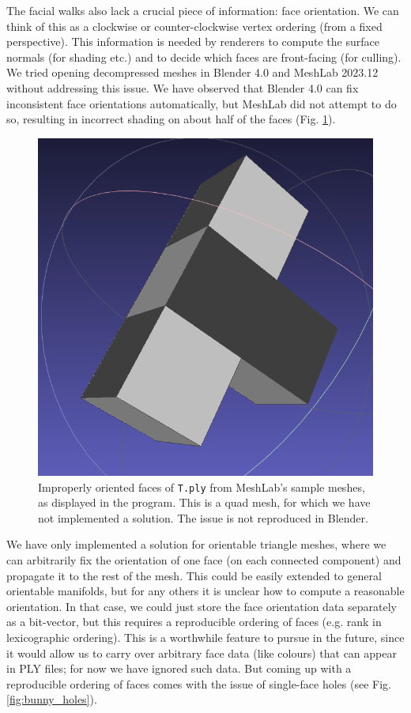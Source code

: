 \documentclass{egpubl}
\begin{document}
The facial walks also lack a crucial piece of information: face orientation. We can think of this as a clockwise or counter-clockwise vertex ordering (from a fixed perspective). This information is needed by renderers to compute the surface normals (for shading etc.) and to decide which faces are front-facing (for culling).
We tried opening decompressed meshes in Blender 4.0 and MeshLab 2023.12 without addressing this issue.
We have observed that Blender 4.0 can fix inconsistent face orientations automatically, but MeshLab did not attempt to do so, resulting in incorrect shading on about half of the faces (Fig. \ref{fig:t_disoriented}).
\begin{figure}[htb]
\centering
\includegraphics[width=.6\linewidth]{figures/t_disoriented.png}
\caption{Improperly oriented faces of \texttt{T.ply} from MeshLab's sample meshes, as displayed in the program. This is a quad mesh, for which we have not implemented a solution. The issue is not reproduced in Blender.}
\label{fig:t_disoriented}
\end{figure}
We have only implemented a solution for orientable triangle meshes, where we can arbitrarily fix the orientation of one face (on each connected component) and propagate it to the rest of the mesh. This could be easily extended to general orientable manifolds, but for any others it is unclear how to compute a reasonable orientation. In that case, we could just store the face orientation data separately as a bit-vector, but this requires a reproducible ordering of faces (e.g. rank in lexicographic ordering).
This is a worthwhile feature to pursue in the future, since it would allow us to carry over arbitrary face data (like colours) that can appear in PLY files; for now we have ignored such data. 
But coming up with a reproducible ordering of faces comes with the issue of single-face holes (see Fig. \ref{fig:bunny_holes}).
\end{document}
